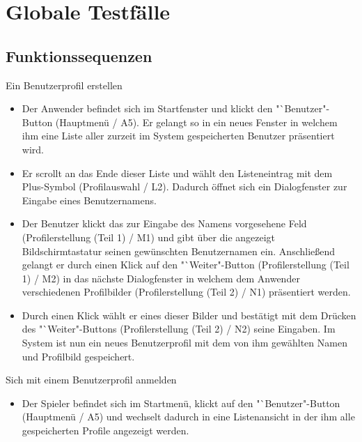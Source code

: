 \section{Globale Testfälle}

\subsection{Funktionssequenzen}

\begin{requirements}

	 Ein Benutzerprofil erstellen
	
	
	\begin{itemize}
  			\item Der Anwender befindet sich im Startfenster und klickt den "`Benutzer"-Button (Hauptmenü / A5). Er gelangt so in ein neues Fenster in welchem ihm eine Liste aller zurzeit im System gespeicherten Benutzer präsentiert wird.
  			
  			\item Er scrollt an das Ende dieser Liste und wählt den Listeneintrag mit dem Plus-Symbol (Profilauswahl / L2). Dadurch öffnet sich ein Dialogfenster zur Eingabe eines Benutzernamens.
  			
  			\item Der Benutzer klickt das zur Eingabe des Namens vorgesehene Feld (Profilerstellung (Teil 1) / M1) und gibt über die angezeigt Bildschirmtastatur seinen gewünschten Benutzernamen ein. Anschließend gelangt er durch einen Klick auf den "`Weiter"-Button (Profilerstellung (Teil 1) / M2) in das nächste Dialogfenster in welchem dem Anwender verschiedenen Profilbilder (Profilerstellung (Teil 2) / N1) präsentiert werden.
  			
  			\item Durch einen Klick wählt er eines dieser Bilder und bestätigt mit dem Drücken des "`Weiter"-Buttons (Profilerstellung (Teil 2) / N2) seine Eingaben. Im System ist nun ein neues Benutzerprofil mit dem von ihm gewählten Namen und Profilbild gespeichert.
  	\end{itemize}
  	
  	
  	
  	 Sich mit einem Benutzerprofil anmelden
  	
  	\begin{itemize}
  			\item Der Spieler befindet sich im Startmenü, klickt auf den "`Benutzer"-Button (Hauptmenü / A5) und wechselt dadurch in eine Listenansicht in der ihm alle gespeicherten Profile angezeigt werden.
  			

\end{itemize}
\end{requirements}
